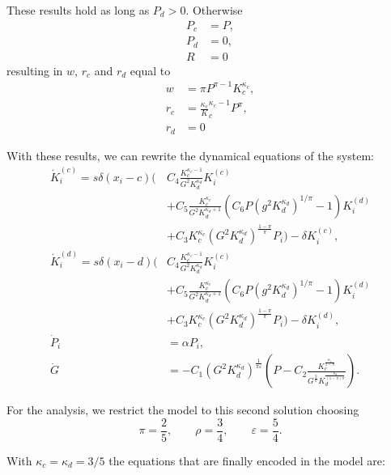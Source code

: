 These results hold as long as $P_d>0$. 
Otherwise 
\begin{align}
	P_c &= P, \\
	P_d &= 0, \\
	R &= 0
	\label{input_share_solution_IIc}
\end{align}
resulting in $w$, $r_c$ and $r_d$ equal to
\begin{align}
	w &= \pi P^{\pi-1}K_c^{\kappa_c}, \\
	r_c &= \frac{\kappa_c}K_c^{\kappa_c-1}P^{\pi}, \\
	r_d &= 0
\end{align}

With these results, we can rewrite the dynamical equations of the system:
\begin{align}
	\dot{K}_i^{(c)} = s \delta(x_i - c) \bigg(& C_4 \frac{K_c^{\kappa_c-1}}{G^2 K_d^{\kappa_d}} K_i^{(c)} \nonumber \\
	&+ C_5 \frac{K_c^{\kappa_c}}{G^2 K_d^{\kappa_d + 1}}\left( C_6 P (g^2 K_d^{\kappa_d})^{1/\pi} -1 \right) K_i^{(d)} \nonumber \\ 
	&+ C_3 K_c^{\kappa_c}(G^2K_d^{\kappa_d})^{\frac{1-\pi}{\pi}} P_i \bigg) - \delta K_i^{(c)}, \\
	\dot{K}_i^{(d)} = s \delta(x_i - d) \bigg(& C_4 \frac{K_c^{\kappa_c-1}}{G^2 K_d^{\kappa_d}} K_i^{(c)} \nonumber \\
	&+ C_5 \frac{K_c^{\kappa_c}}{G^2 K_d^{\kappa_d + 1}}\left( C_6 P (g^2 K_d^{\kappa_d})^{1/\pi} -1 \right) K_i^{(d)} \nonumber \\ 
	&+ C_3 K_c^{\kappa_c}(G^2K_d^{\kappa_d})^{\frac{1-\pi}{\pi}} P_i \bigg) - \delta K_i^{(d)}, \\
	\dot{P}_i &= \alpha P_i, \nonumber \\
	\dot{G} &= - C_1(G^2 K_d^{\kappa_d})^{\frac{1}{\pi \varepsilon}}\left( P - C_2 \frac{K_c^{\frac{\kappa_c}{1-\pi}}}{G^{\frac{2}{\pi}}K_d^{\frac{\kappa_d}{(1-\pi)\pi}}} \right).
\end{align}

For the analysis, we restrict the model to this second solution choosing 
\begin{equation}
	\pi = \frac{2}{5}, \qquad \rho = \frac{3}{4}, \qquad \varepsilon = \frac{5}{4}.
	\label{exponent_values}
\end{equation}

With $\kappa_c = \kappa_d = 3/5$ the equations that are finally encoded in the model are:

